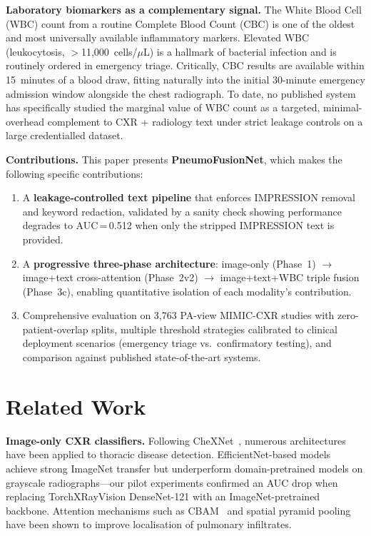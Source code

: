 \documentclass[conference]{IEEEtran}
\begin{document}
\textbf{Laboratory biomarkers as a complementary signal.} The White Blood Cell (WBC) count from a routine Complete Blood Count (CBC) is one of the oldest and most universally available inflammatory markers. Elevated WBC (leukocytosis, $>$11{,}000~cells/$\mu$L) is a hallmark of bacterial infection and is routinely ordered in emergency triage. Critically, CBC results are available within 15~minutes of a blood draw, fitting naturally into the initial 30-minute emergency admission window alongside the chest radiograph. To date, no published system has specifically studied the marginal value of WBC count as a targeted, minimal-overhead complement to CXR + radiology text under strict leakage controls on a large credentialled dataset.

\textbf{Contributions.} This paper presents \textbf{PneumoFusionNet}, which makes the following specific contributions:
\begin{enumerate}[noitemsep, leftmargin=*]
  \item A \textbf{leakage-controlled text pipeline} that enforces IMPRESSION removal and keyword redaction, validated by a sanity check showing performance degrades to AUC\,=\,0.512 when only the stripped IMPRESSION text is provided.
  \item A \textbf{progressive three-phase architecture}: image-only (Phase~1) $\to$ image+text cross-attention (Phase~2v2) $\to$ image+text+WBC triple fusion (Phase~3c), enabling quantitative isolation of each modality's contribution.
  \item Comprehensive evaluation on 3{,}763 PA-view MIMIC-CXR studies with zero-patient-overlap splits, multiple threshold strategies calibrated to clinical deployment scenarios (emergency triage vs.\ confirmatory testing), and comparison against published state-of-the-art systems.
\end{enumerate}

\section{\textcolor{aideep}{Related Work}}

\textbf{Image-only CXR classifiers.} Following CheXNet~\cite{rajpurkar2017chexnet}, numerous architectures have been applied to thoracic disease detection. EfficientNet-based models~\cite{tan2019efficientnet} achieve strong ImageNet transfer but underperform domain-pretrained models on grayscale radiographs---our pilot experiments confirmed an AUC drop when replacing TorchXRayVision DenseNet-121 with an ImageNet-pretrained backbone. Attention mechanisms such as CBAM~\cite{woo2018cbam} and spatial pyramid pooling have been shown to improve localisation of pulmonary infiltrates.
\end{document}

